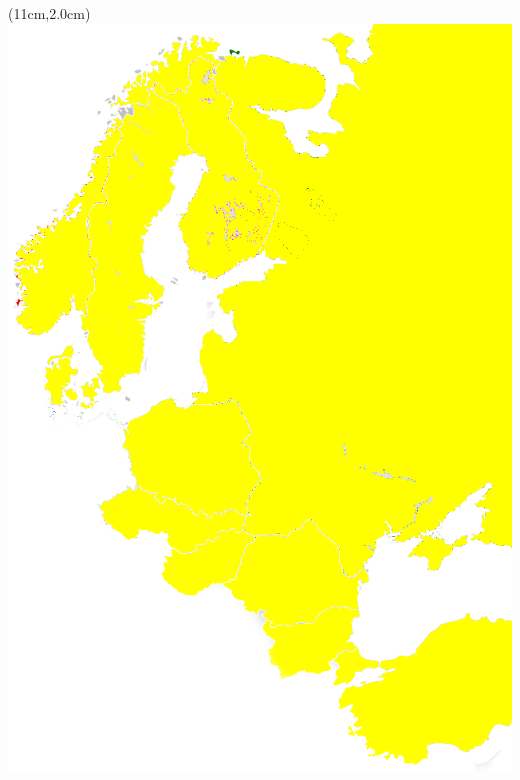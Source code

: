 \begin{frame}
  \begin{textblock*}{2.2cm}(11cm,2.0cm)
    \includegraphics[width=1\columnwidth]{./pictures/1GNordicCountries.png}
  \end{textblock*}
    
\end{frame}

